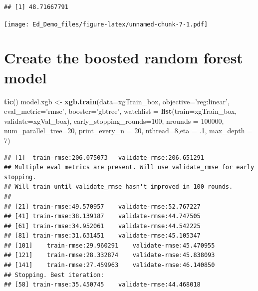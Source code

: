 \documentclass[]{article}
\newenvironment{Shaded}{\begin{snugshade}}{\end{snugshade}}
\newcommand{\KeywordTok}[1]{\textcolor[rgb]{0.13,0.29,0.53}{\textbf{#1}}}
\newcommand{\DataTypeTok}[1]{\textcolor[rgb]{0.13,0.29,0.53}{#1}}
\newcommand{\DecValTok}[1]{\textcolor[rgb]{0.00,0.00,0.81}{#1}}
\newcommand{\FloatTok}[1]{\textcolor[rgb]{0.00,0.00,0.81}{#1}}
\newcommand{\StringTok}[1]{\textcolor[rgb]{0.31,0.60,0.02}{#1}}
\newcommand{\OperatorTok}[1]{\textcolor[rgb]{0.81,0.36,0.00}{\textbf{#1}}}
\newcommand{\NormalTok}[1]{#1}
\begin{document}
\begin{verbatim}
## [1] 48.71667791
\end{verbatim}

\begin{Shaded}
\end{Shaded}

\texttt{[image: Ed\_Demo\_files/figure-latex/unnamed-chunk-7-1.pdf]}

\section{Create the boosted random forest
model}\label{create-the-boosted-random-forest-model}

\begin{Shaded}
\begin{Highlighting}[]
\KeywordTok{tic}\NormalTok{()}
\NormalTok{model.xgb <-}\StringTok{ }\KeywordTok{xgb.train}\NormalTok{(}\DataTypeTok{data=}\NormalTok{xgTrain_box, }\DataTypeTok{objective=}\StringTok{'reg:linear'}\NormalTok{, }\DataTypeTok{eval_metric=}\StringTok{'rmse'}\NormalTok{, }\DataTypeTok{booster=}\StringTok{'gbtree'}\NormalTok{, }\DataTypeTok{watchlist =} \KeywordTok{list}\NormalTok{(}\DataTypeTok{train=}\NormalTok{xgTrain_box, }\DataTypeTok{validate=}\NormalTok{xgVal_box), }
                  \DataTypeTok{early_stopping_rounds=}\DecValTok{100}\NormalTok{, }\DataTypeTok{nrounds =} \DecValTok{100000}\NormalTok{, }\DataTypeTok{num_parallel_tree=}\DecValTok{20}\NormalTok{, }\DataTypeTok{print_every_n =} \DecValTok{20}\NormalTok{, }\DataTypeTok{nthread=}\DecValTok{8}\NormalTok{,}\DataTypeTok{eta =}\NormalTok{ .}\DecValTok{1}\NormalTok{, }\DataTypeTok{max_depth =} \DecValTok{7}\NormalTok{)}
\end{Highlighting}
\end{Shaded}

\begin{verbatim}
## [1]  train-rmse:206.075073   validate-rmse:206.651291 
## Multiple eval metrics are present. Will use validate_rmse for early stopping.
## Will train until validate_rmse hasn't improved in 100 rounds.
## 
## [21] train-rmse:49.570957    validate-rmse:52.767227 
## [41] train-rmse:38.139187    validate-rmse:44.747505 
## [61] train-rmse:34.952061    validate-rmse:44.542225 
## [81] train-rmse:31.631451    validate-rmse:45.105347 
## [101]    train-rmse:29.960291    validate-rmse:45.470955 
## [121]    train-rmse:28.332874    validate-rmse:45.838093 
## [141]    train-rmse:27.459963    validate-rmse:46.140850 
## Stopping. Best iteration:
## [58] train-rmse:35.450745    validate-rmse:44.468018
\end{verbatim}
\end{document}
